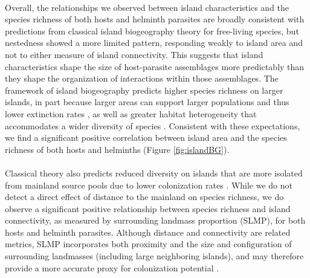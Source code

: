 \paragraph*{} Overall, the relationships we observed between island characteristics and the species richness of both hosts and helminth parasites are broadly consistent with predictions from classical island biogeography theory for free-living species, but nestedness showed a more limited pattern, responding weakly to island area and not to either measure of island connectivity. This suggests that island characteristics shape the size of host-parasite assemblages more predictably than they shape the organization of interactions within those assemblages. The framework of island biogeography predicts higher species richness on larger islands, in part because larger areas can support larger populations and thus lower extinction rates \parencite{macarthur2001}, as well as greater habitat heterogeneity that accommodates a wider diversity of species \parencite{triantis2008measurements, hortal2009island, macdonald2018theory}. Consistent with these expectations, we find a significant positive correlation between island area and the species richness of both hosts and helminths (Figure \ref{fig:islandBG}). 

\paragraph*{} Classical theory also predicts reduced diversity on islands that are more isolated from mainland source pools due to lower colonization rates \parencite{macarthur2001}. While we do not detect a direct effect of distance to the mainland on species richness, we do observe a significant positive relationship between species richness and island connectivity, as measured by surrounding landmass proportion (SLMP), for both hosts and helminth parasites. Although distance and connectivity are related metrics, SLMP incorporates both proximity and the size and configuration of surrounding landmasses (including large neighboring islands), and may therefore provide a more accurate proxy for colonization potential \parencite{Weigelt2013, weigelt2013quantifying, barreto2021area}. 

